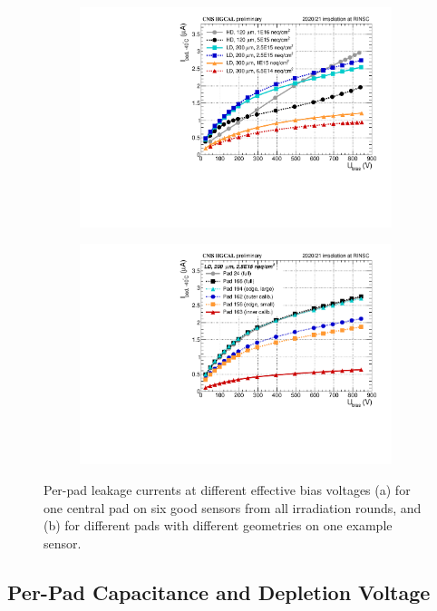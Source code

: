 \begin{figure}
	\captionsetup[subfigure]{aboveskip=-1pt,belowskip=-1pt}
	\centering
	\begin{subfigure}[b]{0.49\textwidth}
		\includegraphics[width=0.999\textwidth]{plots/channel_iv/channel_IV_sensors_sensors.pdf}
		\subcaption{
		}
		\label{plot:tot_IV_good}
	\end{subfigure}
	\hfill
	\begin{subfigure}[b]{0.49\textwidth}
		\includegraphics[width=0.999\textwidth]{plots/channel_iv/channel_IV_sensors_channels.pdf}
		\subcaption{
		}
		\label{plot:tot_IV_bad}
	\end{subfigure}
	\caption{
		Per-pad leakage currents at different effective bias voltages (a) for one central pad on six good sensors from all irradiation rounds, and (b) for different pads with different geometries on one example sensor.
	}
\end{figure}



\subsection{Per-Pad Capacitance and Depletion Voltage}
\label{subsec:QA_Vdep}
